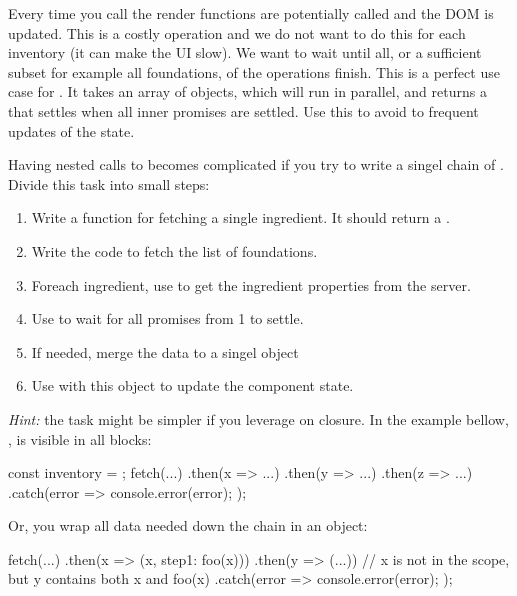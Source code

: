 \documentclass[fleqn, article, a4paper]{memoir}
\begin{document}
\begin{Assignments}
Every time you call  the render functions are potentially called and the DOM is updated. This is a costly operation and we do not want to do this for each inventory (it can make the UI slow). We want to wait until all, or a sufficient subset for example all foundations, of the  operations finish. This is a perfect use case for . It takes an array of  objects, which will run in parallel, and returns a  that settles when all inner promises are settled. Use this to avoid to frequent updates of the state.

Having nested calls to  becomes complicated if you try to write a singel chain of . Divide this task into small steps:
\begin{enumerate}
\item Write a function for fetching a single ingredient. It should return a .
\item Write the code to fetch the list of foundations.
\item Foreach ingredient, use  to get the ingredient properties from the server.
\item Use  to wait for all promises from 1 to settle.
\item If needed, merge the data to a singel object
\item Use  with this object to update the component state.
\end{enumerate}
\emph{Hint:} the task might be simpler if you leverage on closure. In the example bellow, , is visible in all  blocks:
\begin{Code}
const inventory = {};
fetch(...)
.then(x => {...})
.then(y => {...})
.then(z => {...})
.catch(error => {
  console.error(error);
});
\end{Code}
\noindent Or, you wrap all data needed down the chain in an object:
\begin{Code}
fetch(...)
.then(x => ({x, step1: foo(x)}))
.then(y => (...)) // x is not in the scope, but y contains both x and foo(x)
.catch(error => {
  console.error(error);
});
\end{Code}

\end{Assignments}
\end{document}
